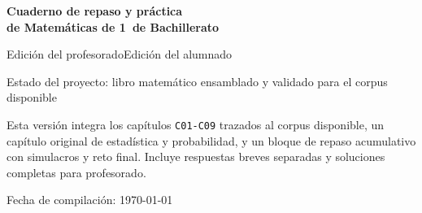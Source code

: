 \begin{titlepage}
\thispagestyle{fancy}
\centering
\vspace*{3cm}

{\Huge\bfseries Cuaderno de repaso y pr\'actica\\[0.4em] de Matem\'aticas de 1\textordmasculine\ de Bachillerato\par}
\vspace{1.5cm}

{\Large \ifteacheredition Edici\'on del profesorado\else Edici\'on del alumnado\fi\par}
\vspace{1.5cm}

{\large Estado del proyecto: libro matem\'atico ensamblado y validado para el corpus disponible\par}
\vspace{0.5cm}

\begin{tcolorbox}[basebox,width=0.85\textwidth]
Esta versi\'on integra los cap\'itulos \texttt{C01-C09} trazados al corpus disponible, un
cap\'itulo original de estad\'istica y probabilidad, y un bloque de repaso acumulativo con
simulacros y reto final. Incluye respuestas breves separadas y soluciones completas para
profesorado.
\end{tcolorbox}

\vfill
{\large Fecha de compilaci\'on: \today\par}
\end{titlepage}
